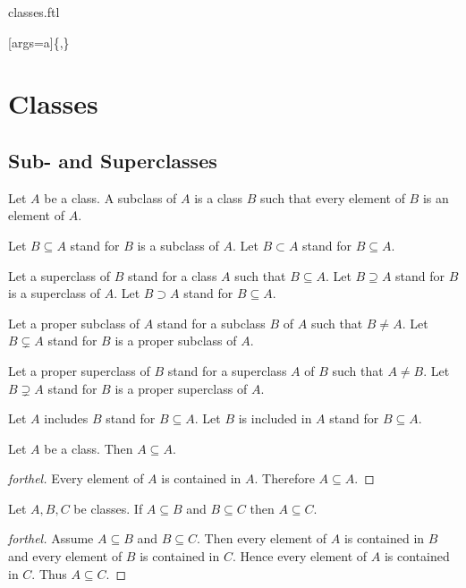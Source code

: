 \documentclass{naproche-library}
\begin{document}
\begin{smodule}{classes.ftl}
  
  [args=a]{\{,\}}

  \section*{Classes}

  \subsection*{Sub- and Superclasses}

  \begin{definition}[forthel,id=FOUNDATIONS_01_3275578358628352]
    Let $A$ be a class.
    A subclass of $A$ is a class $B$ such that every element of $B$ is an
    element of $A$.

    Let $B \subseteq A$ stand for $B$ is a subclass of $A$.
    Let $B \subset A$ stand for $B \subseteq A$.

    Let a superclass of $B$ stand for a class $A$ such that $B \subseteq A$.
    Let $B \supseteq A$ stand for $B$ is a superclass of $A$.
    Let $B \supset A$ stand for $B \subseteq A$.

    Let a proper subclass of $A$ stand for a subclass $B$ of $A$ such that $B \neq A$.
    Let $B \subsetneq A$ stand for $B$ is a proper subclass of $A$.

    Let a proper superclass of $B$ stand for a superclass $A$ of $B$ such that $A \neq B$.
    Let $B \supsetneq A$ stand for $B$ is a proper superclass of $A$.

    Let $A$ includes $B$ stand for $B \subseteq A$.
    Let $B$ is included in $A$ stand for $B \subseteq A$.
  \end{definition}

  \begin{proposition}[forthel,id=FOUNDATIONS_01_5994555614691328]
    Let $A$ be a class.
    Then $A \subseteq A$.
  \end{proposition}
  \begin{proof}[forthel]
    Every element of $A$ is contained in $A$.
    Therefore $A \subseteq A$.
  \end{proof}

  \begin{proposition}[forthel,id=FOUNDATIONS_01_3939677545431040]
    Let $A, B, C$ be classes.
    If $A \subseteq B$ and $B \subseteq C$ then $A \subseteq C$.
  \end{proposition}
  \begin{proof}[forthel]
    Assume $A \subseteq B$ and $B \subseteq C$.
    Then every element of $A$ is contained in $B$ and every element of $B$ is contained in $C$.
    Hence every element of $A$ is contained in $C$.
    Thus $A \subseteq C$.
  \end{proof}


\end{smodule}
\end{document}

